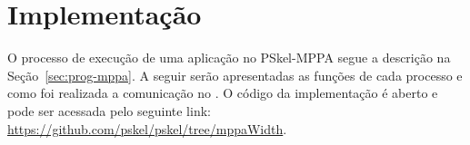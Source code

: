 %




%

\section{Implementação}
O processo de execução de uma aplicação no PSkel-MPPA segue a descrição na
Seção~\ref{sec:prog-mppa}. A seguir serão apresentadas as funções de cada
processo e como foi realizada a comunicação no \mppa. O código da implementação
é aberto e pode ser acessada pelo seguinte link: \url{https://github.com/pskel/pskel/tree/mppaWidth}.

